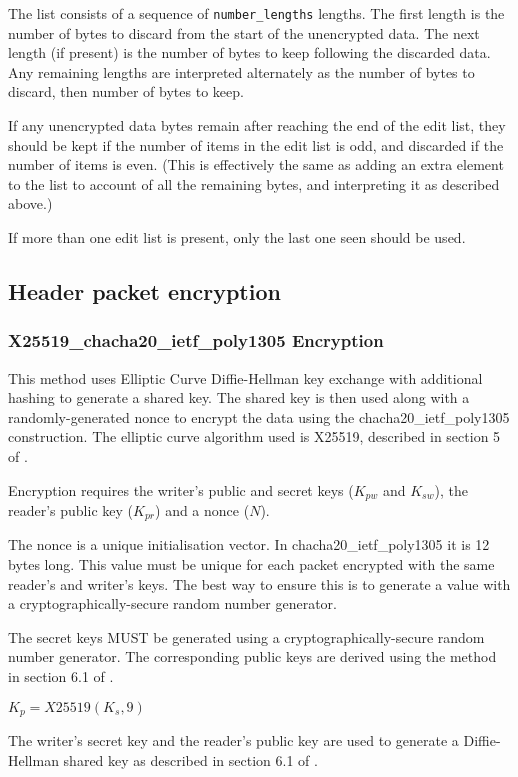 \documentclass[10pt]{article}
\newcommand{\kw}[1]{\texttt{#1}}
\begin{document}
The list consists of a sequence of \kw{number\_lengths} lengths.
The first length is the number of bytes to discard from the start of the unencrypted data.
The next length (if present) is the number of bytes to keep following the discarded data.
Any remaining lengths are interpreted alternately as the number of bytes to discard, then number of bytes to keep.

If any unencrypted data bytes remain after reaching the end of the edit list, they should be kept if the number of
items in the edit list is odd, and discarded if the number of items is even.
(This is effectively the same as adding an extra element to the list to account of all the remaining bytes, and
interpreting it as described above.)

If more than one edit list is present, only the last one seen should be used.

\subsection{Header packet encryption}

\subsubsection{X25519\_chacha20\_ietf\_poly1305 Encryption}

This method uses Elliptic Curve Diffie-Hellman key exchange with additional hashing to generate a shared key.
The shared key is then used along with a randomly-generated nonce to encrypt the data using the chacha20\_ietf\_poly1305
construction.
The elliptic curve algorithm used is X25519, described in section 5 of \cite{RFC7748}.

Encryption requires the writer's public and secret keys ($K_{pw}$ and $K_{sw}$), the reader's public key ($K_{pr}$)
and a nonce ($N$).

The nonce is a unique initialisation vector.
In chacha20\_ietf\_poly1305 it is 12 bytes long.
This value must be unique for each packet encrypted with the same reader's and writer's keys.
The best way to ensure this is to generate a value with a cryptographically-secure random number generator.

The secret keys MUST be generated using a cryptographically-secure random number generator.
The corresponding public keys are derived using the method in section 6.1 of \cite{RFC7748}.

$K_p = X25519(K_s, 9)$

The writer's secret key and the reader's public key are used to generate a Diffie-Hellman shared key as described in
section 6.1 of \cite{RFC7748}.
\end{document}
